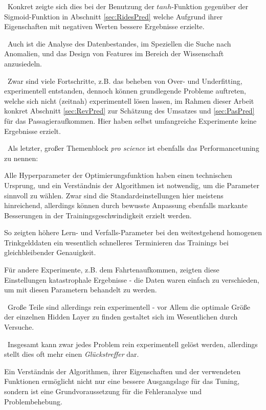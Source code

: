 ~\newline  Konkret zeigte sich dies bei der Benutzung der $tanh$-Funktion gegenüber der Sigmoid-Funktion in Abschnitt \ref{sec:RidesPred} welche Aufgrund ihrer Eigenschaften mit negativen Werten bessere Ergebnisse erzielte. 

~\newline Auch ist die Analyse des Datenbestandes, im Speziellen die Suche nach Anomalien, und das Design von Features im Bereich der Wissenschaft anzusiedeln. 

~\newline Zwar sind viele Fortschritte, z.B. das beheben von Over- und Underfitting, experimentell entstanden, dennoch können 
grundlegende Probleme auftreten, welche sich nicht (zeitnah) experimentell lösen lassen, im Rahmen dieser Arbeit konkret Abschnitt \ref{sec:RevPred} zur Schätzung des Umsatzes und \ref{sec:PasPred} für das Passagieraufkommen. Hier haben selbst umfangreiche Experimente keine Ergebnisse erzielt.

~\newline  Als letzter, großer Themenblock \textit{pro science} ist ebenfalls das Performancetuning zu nennen: 

Alle Hyperparameter der Optimierungsfunktion haben einen technischen Ursprung, und ein Verständnis der Algorithmen ist notwendig, um die Parameter sinnvoll zu wählen. Zwar sind die Standardeinstellungen hier meistens hinreichend, allerdings können durch bewusste Anpassung ebenfalls markante Besserungen in der Trainingsgeschwindigkeit erzielt werden. 

So zeigten höhere Lern- und Verfalls-Parameter bei den weitestgehend homogenen Trinkgelddaten ein wesentlich schnelleres Terminieren das Trainings bei gleichbleibender Genauigkeit. 

Für andere Experimente, z.B. dem Fahrtenaufkommen, zeigten diese Einstellungen katastrophale Ergebnisse - die Daten waren einfach zu verschieden, um mit diesen Parametern behandelt zu werden. 

~\newline Große Teile sind allerdings rein experimentell - vor Allem die optimale Größe der einzelnen Hidden Layer zu finden gestaltet sich im Wesentlichen durch Versuche.

~\newline Insgesamt kann zwar jedes Problem rein experimentell gelöst werden, allerdings stellt dies oft mehr einen \textit{Glückstreffer} dar. 

Ein Verständnis der Algorithmen, ihrer Eigenschaften und der verwendeten Funktionen ermöglicht nicht nur eine bessere Ausgangslage für das Tuning, sondern ist eine Grundvoraussetzung für die Fehleranalyse und Problembehebung. 


